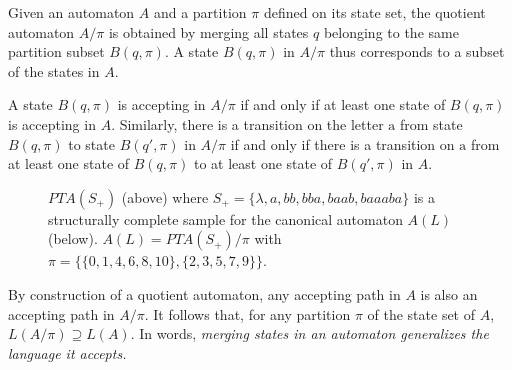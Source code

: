 \begin{definition}
Given an automaton $A$ and a partition $\pi$ defined on its state set, the quotient automaton $A/\pi$ is obtained by merging all states $q$ belonging to the same partition subset $B(q,\pi)$. A state $B(q,\pi)$ in $A/\pi$ thus corresponds to a subset of the states in $A$. 

A state $B(q,\pi)$ is accepting in $A/\pi$ if and only if at least one state of $B(q,\pi)$ is accepting in $A$. Similarly, there is a transition on the letter $\mathrm{a}$ from state $B(q,\pi)$ to state $B(q',\pi)$ in $A/\pi$ if and only if there is a transition on $\mathrm{a}$ from at least one state of $B(q,\pi)$ to at least one state of $B(q',\pi)$ in $A$. 
\end{definition}

\begin{figure}
\begin{center}
\caption{$PTA(S_+)$ (above) where $S_+ = \{\lambda,a,bb,bba,baab,baaaba\}$ is a structurally complete sample 
for the canonical automaton $A(L)$ (below). $A(L) = PTA(S_+)/\pi$ with $\pi=\{\{0,1,4,6,8,10\},\{2,3,5,7,9\}\}$.\label{fig:pta:quotient}}
\end{center}
\end{figure}

By construction of a quotient automaton, any accepting path in $A$ is also an accepting path in $A/\pi$. It follows that, for any partition $\pi$ of the state set of $A$, $L(A/\pi) \supseteq L(A)$. In words, \textsl{merging states in an automaton generalizes the language it accepts.}
 
